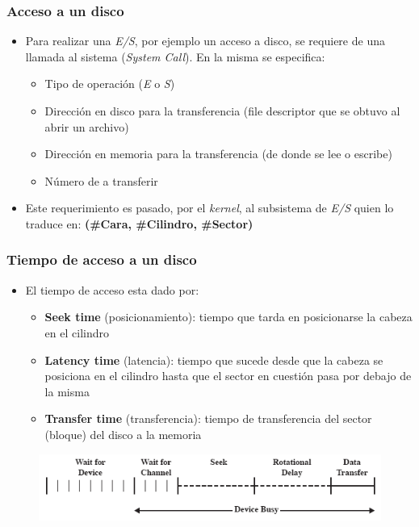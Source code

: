 \begin{frame}
  \frametitle{Acceso a un disco}
  \begin{itemize}
  	\item Para realizar una \emph{E/S}, por ejemplo un acceso a disco, se requiere de una llamada al sistema (\textit{System Call}). En la misma se especifica:
  	\begin{itemize}
  		\item Tipo de operación (\emph{E} o \emph{S})
  		\item Dirección en disco para la transferencia (file descriptor que se obtuvo al abrir un archivo)
  		\item Dirección en memoria para la transferencia (de donde se lee o escribe)
  		\item Número de \bytes a transferir
  	\end{itemize}
  	\item Este requerimiento es pasado, por el \textit{kernel}, al subsistema de \emph{E/S} quien lo traduce en: \textbf{(\#Cara, \#Cilindro, \#Sector)}
  \end{itemize}
\end{frame}

\begin{frame}
  \frametitle{Tiempo de acceso a un disco}
  \begin{itemize}
    \item El tiempo de acceso esta dado por:
    \begin{itemize}
      \item \textbf{Seek time} (posicionamiento): tiempo que tarda en posicionarse la cabeza en el cilindro 
      \item \textbf{Latency time} (latencia): tiempo que sucede desde que la cabeza se posiciona en el cilindro hasta que el sector en cuestión pasa por debajo de la misma
      \item \textbf{Transfer time} (transferencia): tiempo de transferencia del sector (bloque) del disco a la memoria
    \end{itemize}    
  \end{itemize}
  \begin{figure}
      \includegraphics[scale=0.4]{images/dat.png}
  \end{figure}
\end{frame}

